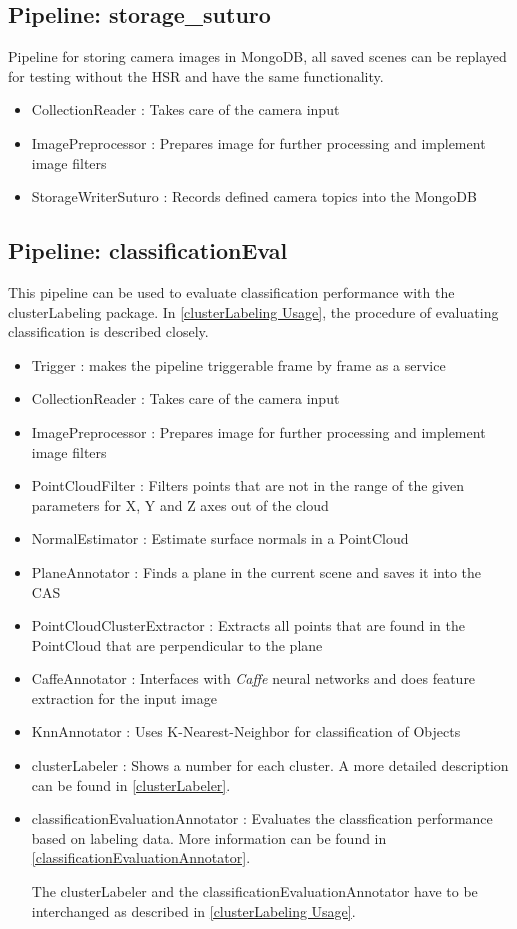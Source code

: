 \documentclass[main.tex]{subfiles}
\begin{document}
            \subsection{Pipeline: storage\_suturo} 
Pipeline for storing camera images in MongoDB, all saved scenes can be replayed for testing without the HSR and have the same functionality. 
\begin{itemize}
    \item CollectionReader : Takes care of the camera input
    \item ImagePreprocessor : Prepares image for further processing and implement image filters 
    \item StorageWriterSuturo :  Records defined camera topics into the MongoDB
\end{itemize}

\subsection{Pipeline: classificationEval}\label{Pipeline: classificationEval}
This pipeline can be used to evaluate classification performance with the clusterLabeling package. In \ref{clusterLabeling Usage}, the procedure of evaluating classification is described closely.

\begin{itemize}
	\item Trigger : makes the pipeline triggerable frame by frame as a service
  	\item CollectionReader : Takes care of the camera input
    \item ImagePreprocessor : Prepares image for further processing and implement image filters  
    \item PointCloudFilter : Filters points that are not in the range of the given parameters for X, Y and Z axes out of the cloud
    \item NormalEstimator : Estimate surface normals in a PointCloud 
    \item PlaneAnnotator : Finds a plane in the current scene and saves it into the CAS
  	\item PointCloudClusterExtractor :  Extracts all points that are found in the PointCloud that are perpendicular to the plane 
	\item CaffeAnnotator : Interfaces with \textit{Caffe} neural networks and does feature extraction for the input image
    \item KnnAnnotator : Uses K-Nearest-Neighbor for classification of Objects 
    \item clusterLabeler : Shows a number for each cluster. A more detailed description can be found in \ref{clusterLabeler}.
    \item classificationEvaluationAnnotator : Evaluates the classfication performance based on labeling data. More information can be found in \ref{classificationEvaluationAnnotator}.
    
    The clusterLabeler and the classificationEvaluationAnnotator have to be interchanged as described in \ref{clusterLabeling Usage}.
\end{itemize}
\end{document}
